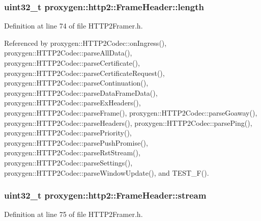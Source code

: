 \subsubsection[{length}]{\setlength{\rightskip}{0pt plus 5cm}uint32\+\_\+t proxygen\+::http2\+::\+Frame\+Header\+::length}\label{structproxygen_1_1http2_1_1FrameHeader_a009ad761137f421b35a49f551bc52e57}


Definition at line 74 of file H\+T\+T\+P2\+Framer.\+h.



Referenced by proxygen\+::\+H\+T\+T\+P2\+Codec\+::on\+Ingress(), proxygen\+::\+H\+T\+T\+P2\+Codec\+::parse\+All\+Data(), proxygen\+::\+H\+T\+T\+P2\+Codec\+::parse\+Certificate(), proxygen\+::\+H\+T\+T\+P2\+Codec\+::parse\+Certificate\+Request(), proxygen\+::\+H\+T\+T\+P2\+Codec\+::parse\+Continuation(), proxygen\+::\+H\+T\+T\+P2\+Codec\+::parse\+Data\+Frame\+Data(), proxygen\+::\+H\+T\+T\+P2\+Codec\+::parse\+Ex\+Headers(), proxygen\+::\+H\+T\+T\+P2\+Codec\+::parse\+Frame(), proxygen\+::\+H\+T\+T\+P2\+Codec\+::parse\+Goaway(), proxygen\+::\+H\+T\+T\+P2\+Codec\+::parse\+Headers(), proxygen\+::\+H\+T\+T\+P2\+Codec\+::parse\+Ping(), proxygen\+::\+H\+T\+T\+P2\+Codec\+::parse\+Priority(), proxygen\+::\+H\+T\+T\+P2\+Codec\+::parse\+Push\+Promise(), proxygen\+::\+H\+T\+T\+P2\+Codec\+::parse\+Rst\+Stream(), proxygen\+::\+H\+T\+T\+P2\+Codec\+::parse\+Settings(), proxygen\+::\+H\+T\+T\+P2\+Codec\+::parse\+Window\+Update(), and T\+E\+S\+T\+\_\+\+F().

\subsubsection[{stream}]{\setlength{\rightskip}{0pt plus 5cm}uint32\+\_\+t proxygen\+::http2\+::\+Frame\+Header\+::stream}\label{structproxygen_1_1http2_1_1FrameHeader_ab92cd576f2a3c6622039a6aa7e3a0653}


Definition at line 75 of file H\+T\+T\+P2\+Framer.\+h.



